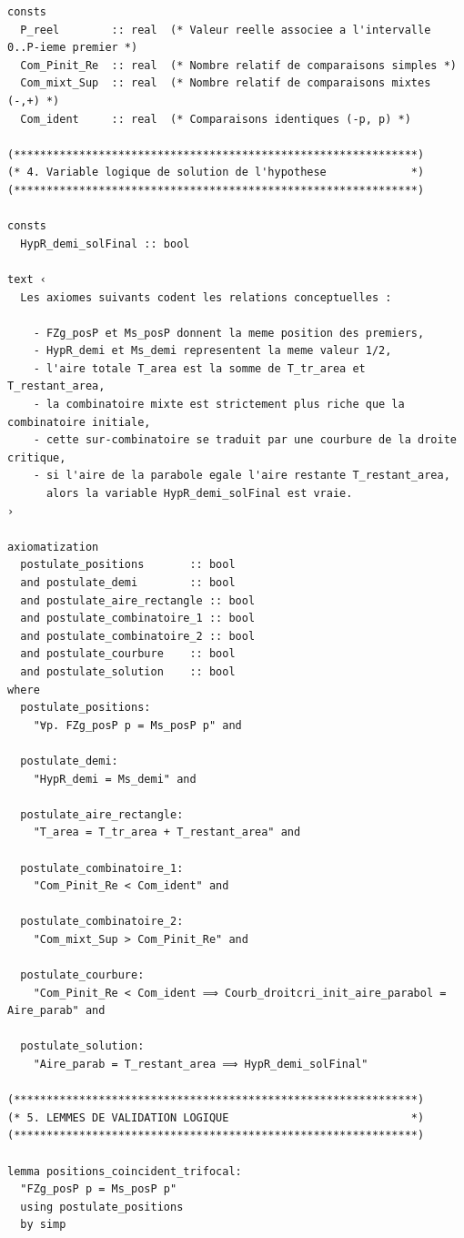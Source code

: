 \documentclass[a4paper,11pt]{article}
\begin{document}
\begin{holcode}[title={\textcolor{white}{Fichier : methode\_spectral.thy -- Partie 1/4}}]
\begin{lstlisting}
consts
  P_reel        :: real  (* Valeur reelle associee a l'intervalle 0..P-ieme premier *)
  Com_Pinit_Re  :: real  (* Nombre relatif de comparaisons simples *)
  Com_mixt_Sup  :: real  (* Nombre relatif de comparaisons mixtes (-,+) *)
  Com_ident     :: real  (* Comparaisons identiques (-p, p) *)

(**************************************************************)
(* 4. Variable logique de solution de l'hypothese             *)
(**************************************************************)

consts
  HypR_demi_solFinal :: bool

text ‹
  Les axiomes suivants codent les relations conceptuelles :

    - FZg_posP et Ms_posP donnent la meme position des premiers,
    - HypR_demi et Ms_demi representent la meme valeur 1/2,
    - l'aire totale T_area est la somme de T_tr_area et T_restant_area,
    - la combinatoire mixte est strictement plus riche que la combinatoire initiale,
    - cette sur-combinatoire se traduit par une courbure de la droite critique,
    - si l'aire de la parabole egale l'aire restante T_restant_area,
      alors la variable HypR_demi_solFinal est vraie.
›

axiomatization
  postulate_positions       :: bool
  and postulate_demi        :: bool
  and postulate_aire_rectangle :: bool
  and postulate_combinatoire_1 :: bool
  and postulate_combinatoire_2 :: bool
  and postulate_courbure    :: bool
  and postulate_solution    :: bool
where
  postulate_positions:
    "∀p. FZg_posP p = Ms_posP p" and

  postulate_demi:
    "HypR_demi = Ms_demi" and

  postulate_aire_rectangle:
    "T_area = T_tr_area + T_restant_area" and

  postulate_combinatoire_1:
    "Com_Pinit_Re < Com_ident" and

  postulate_combinatoire_2:
    "Com_mixt_Sup > Com_Pinit_Re" and

  postulate_courbure:
    "Com_Pinit_Re < Com_ident ⟹ Courb_droitcri_init_aire_parabol = Aire_parab" and

  postulate_solution:
    "Aire_parab = T_restant_area ⟹ HypR_demi_solFinal"

(**************************************************************)
(* 5. LEMMES DE VALIDATION LOGIQUE                            *)
(**************************************************************)

lemma positions_coincident_trifocal:
  "FZg_posP p = Ms_posP p"
  using postulate_positions
  by simp


\end{lstlisting}
\end{holcode}
\end{document}

